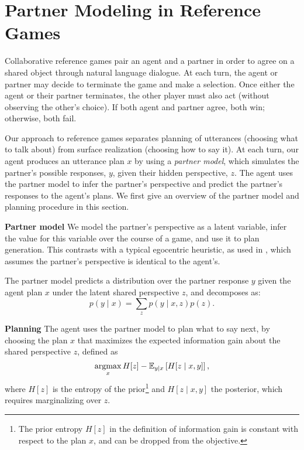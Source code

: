 \documentclass[11pt]{article}
\begin{document}
\appendix



\section{Partner Modeling in Reference Games}
\label{sec:planning}

Collaborative reference games pair an agent and a partner in order to agree on a shared object through natural language dialogue.
At each turn, the agent or partner may decide to terminate the game and make a selection.
Once either the agent or their partner terminates, the other player must also act (without observing the other's choice). If both agent and partner agree, both win; otherwise, both fail. 

Our approach to reference games separates planning of utterances (choosing what to talk about) from surface realization (choosing how to say it).
At each turn, our agent produces an utterance plan $x$ by using a \emph{partner model}, which simulates the partner's possible responses, $y$, given their hidden perspective, $z$.
The agent uses the partner model to infer the partner's perspective and predict the partner's responses to the agent's plans.
We first give an overview of the partner model 
and planning procedure in this section.

\noindent \textbf{Partner model}
We model the partner's perspective as a latent variable, infer the value for this variable over the course of a game, and use it to plan generation.
This contrasts with a typical egocentric heuristic, as used in \citet{fried}, which assumes the partner's perspective
is identical to the agent's.

The partner model predicts a distribution over the partner response $y$ given the agent plan $x$ under the latent shared perspective $z$, and decomposes as:
$$p(y \mid x) = \sum_z p(y \mid x,z)p(z).$$


\noindent  \textbf{Planning}
The agent uses the partner model to plan
what to say next, by choosing
the plan $x$ that maximizes the expected information gain  \citep{lindley} about the shared perspective $z$,
defined as
$$\operatorname*{argmax}_x H[z] - \mathbb{E}_{y \mid x}\left[H[z \mid x,y]\right],$$
where $H[z]$ is the entropy of the prior\footnote{The prior entropy $H[z]$ in the definition of information gain is constant with respect to
the plan $x$, and can be dropped from the objective.}
 and $H[z\mid x,y]$ the posterior,
which requires marginalizing over $z$.
\end{document}
